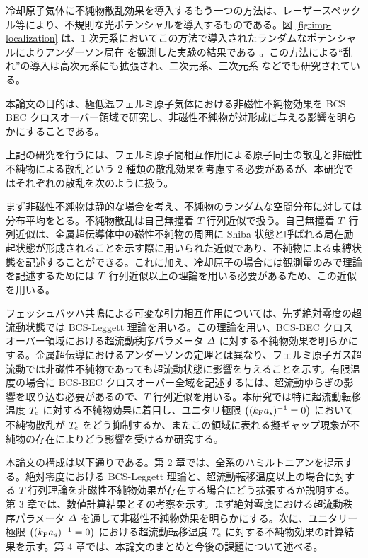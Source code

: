 冷却原子気体に不純物散乱効果を導入するもう一つの方法は、レーザースペックル等により、不規則な光ポテンシャルを導入するものである。図 \ref{fig:imp-localization} は、1 次元系においてこの方法で導入されたランダムなポテンシャルによりアンダーソン局在 \cite{andersonlocal1958} を観測した実験の結果である \cite{billy2008}。この方法による“乱れ”の導入は高次元系にも拡張され、二次元系\cite{robert2010}、三次元系\cite{Kondov2011,Jendrzejewski2011} などでも研究されている。



本論文の目的は、極低温フェルミ原子気体における非磁性不純物効果を BCS-BEC クロスオーバー領域で研究し、非磁性不純物が対形成に与える影響を明らかにすることである。

上記の研究を行うには、フェルミ原子間相互作用による原子同士の散乱と非磁性不純物による散乱という 2 種類の散乱効果を考慮する必要があるが、本研究ではそれぞれの散乱を次のように扱う。

まず非磁性不純物は静的な場合を考え、不純物のランダムな空間分布に対しては分布平均をとる。不純物散乱は自己無撞着 $T$ 行列近似で扱う。自己無撞着 $T$~行列近似は、金属超伝導体中の磁性不純物の周囲に Shiba 状態と呼ばれる局在励起状態が形成されることを示す際に用いられた近似であり、不純物による束縛状態を記述することができる。これに加え、冷却原子の場合には観測量のみで理論を記述するためには $T$~行列近似以上の理論を用いる必要があるため、この近似を用いる。

フェッシュバッハ共鳴による可変な引力相互作用については、先ず絶対零度の超流動状態では BCS-Leggett 理論を用いる。この理論を用い、BCS-BEC クロスオーバー領域における超流動秩序パラメータ $\varDelta$ に対する不純物効果を明らかにする。金属超伝導におけるアンダーソンの定理とは異なり、フェルミ原子ガス超流動では非磁性不純物であっても超流動状態に影響を与えることを示す。有限温度の場合に BCS-BEC クロスオーバー全域を記述するには、超流動ゆらぎの影響を取り込む必要があるので、$T$ 行列近似を用いる。本研究では特に超流動転移温度 $T_{\text{c}}$ に対する不純物効果に着目し、ユニタリ極限 $\left((k_{\text{F}} a_s)^{-1}=0\right)$ において不純物散乱が $T_{\text{c}}$ をどう抑制するか、またこの領域に表れる擬ギャップ現象が不純物の存在によりどう影響を受けるか研究する。

本論文の構成は以下通りである。第 2 章では、全系のハミルトニアンを提示する。絶対零度における BCS-Leggett 理論と、超流動転移温度以上の場合に対する $T$ 行列理論を非磁性不純物効果が存在する場合にどう拡張するか説明する。第 3 章では、数値計算結果とその考察を示す。まず絶対零度における超流動秩序パラメータ $\varDelta$ を通して非磁性不純物効果を明らかにする。次に、ユニタリー極限 $\left((k_{\text{F}} a_s)^{-1}=0\right)$ における超流動転移温度 $T_{\text{c}}$ に対する不純物効果の計算結果を示す。第 4 章では、本論文のまとめと今後の課題について述べる。

